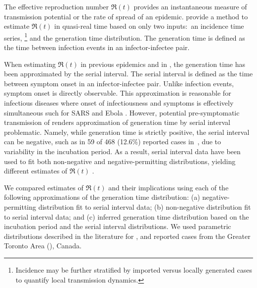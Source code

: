 The effective reproduction number $\Re(t)$ provides
an instantaneous measure of transmission potential
or the rate of spread of an epidemic.
\citet{Cori2013} provide a method to estimate $\Re(t)$
in quasi-real time based on only two inputs:\
an incidence time series,%
\footnote{Incidence may be further stratified by
  imported versus locally generated cases
  to quantify local transmission dynamics.}
and the generation time distribution.
The generation time is defined as
the time between infection events in an infector-infectee pair.
\par
When estimating $\Re(t)$
in previous epidemics \citep{Cori2013,Ali2013,Aylward2014}
and in \covid \citep{Pan2020,Cowling2020,Leung2020,Liu2020},
the generation time has been approximated by the serial interval.
The serial interval is defined as
the time between symptom onset in an infector-infectee pair.
Unlike infection events, symptom onset is directly observable.
This approximation is reasonable for infectious diseases
where onset of infectiousness and symptoms
is effectively simultaneous \citep{Cori2013}
such for SARS and Ebola \citep{Zeng2009,Osterholm2015}.
However, potential pre-symptomatic transmission of \covid
\citep{Kimball2020,Du2020}
renders approximation of generation time by serial interval problematic.
Namely, while generation time is strictly positive,
the serial interval can be negative,
such as in 59 of 468 (12.6\%) reported cases in~\citep{Du2020},
due to variability in the incubation period.
As a result, \covid serial interval data have been used to fit both
non-negative and negative-permitting distributions,
yielding different estimates of $\Re(t)$
\citep{Du2020,Zhang2020,Ganyani2020}.
\par
We compared estimates of $\Re(t)$ and their implications using
each of the following approximations of the generation time distribution:
(a) negative-permitting distribution fit to serial interval data;
(b) non-negative distribution fit to serial interval data; and
(c) inferred generation time distribution based on
the incubation period and the serial interval distributions.
We used parametric distributions described in the literature for \covid,
and reported cases from the Greater Toronto Area (\gta), Canada.
